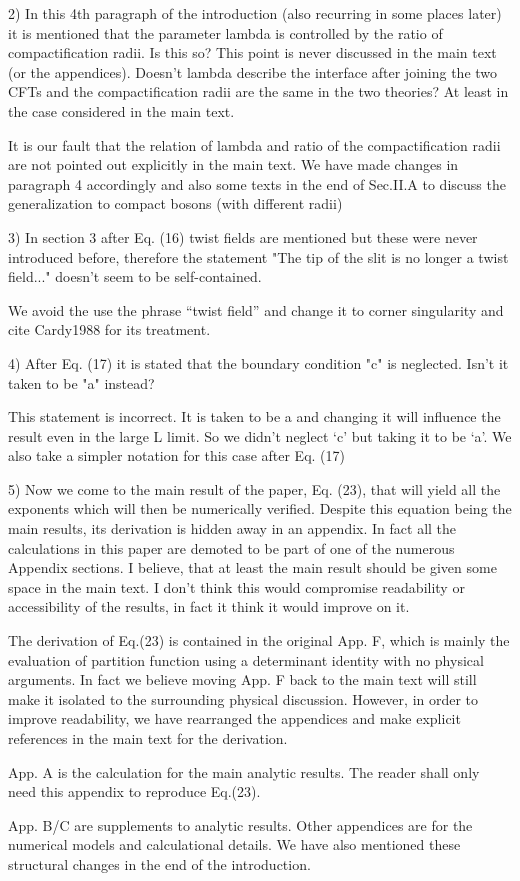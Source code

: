 \documentclass{article}
\newcommand{\reply}[1]{{\color{black}#1}}
\begin{document}
2) In this 4th paragraph of the introduction (also recurring in some places later) it is mentioned that the parameter lambda is controlled by the ratio of compactification radii. Is this so? This point is never discussed in the main text (or the appendices). Doesn't lambda describe the interface after joining the two CFTs and the compactification radii are the same in the two theories? At least in the case considered in the main text.

\reply{It is our fault that the relation of lambda and ratio of the compactification radii are not pointed out explicitly in the main text. 
We have made changes in paragraph 4 accordingly and also some texts in the end of Sec.II.A to discuss the generalization to compact bosons (with different radii)}

3) In section 3 after Eq. (16) twist fields are mentioned but these were never introduced before, therefore the statement "The tip of the slit is no longer a twist field..." doesn't seem to be self-contained.

\reply{We avoid the use the phrase ``twist field'' and change it to corner singularity and cite Cardy1988 for its treatment.}

4) After Eq. (17) it is stated that the boundary condition "c" is neglected. Isn't it taken to be "a" instead?

\reply{This statement is incorrect. It is taken to be a and changing it will influence the result even in the large L limit. So we didn’t neglect ‘c’ but taking it to be ‘a’. We also take a simpler notation for this case after Eq. (17) }

5) Now we come to the main result of the paper, Eq. (23), that will yield all the exponents which will then be numerically verified. Despite this equation being the main results, its derivation is hidden away in an appendix. In fact all the calculations in this paper are demoted to be part of one of the numerous Appendix sections. I believe, that at least the main result should be given some space in the main text. I don't think this would compromise readability or accessibility of the results, in fact it think it would improve on it.

\reply{The derivation of Eq.(23) is contained in the original App. F, which is mainly the evaluation of partition function using a determinant identity with no physical arguments. In fact we believe moving App. F back to the main text will still make it isolated to the surrounding physical discussion.  However, in order to improve readability, we have rearranged the appendices and make explicit references in the main text for the derivation.

App. A is the calculation for the main analytic results. The reader shall only need this appendix to reproduce Eq.(23). 

App. B/C are supplements to analytic results. Other appendices are for the numerical models and calculational details. We have also mentioned these structural changes in the end of the introduction.}
\end{document}
